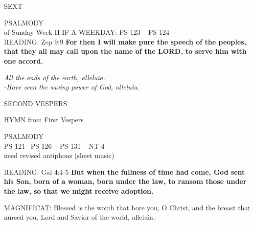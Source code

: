 \begin{flushleft}\normalsize{\uppercase{SEXT\\}}\end{flushleft}
\noindent\small{\uppercase{PSALMODY}\\} of Sunday Week II
\uppercase{If a weekday: Ps 123 -- Ps 124}\vspace{0.5em}\\

\noindent\small{\uppercase{READING:}}    Zep 9:9 \textbf{   For then I will make pure the speech of the peoples, that they all may call upon the name of the LORD, to serve him with one accord.\\}
\begin{center}\textit{All the ends of the earth, alleluia.\\
-Have seen the saving power of God, alleluia.}\end{center}

\begin{flushleft}\normalsize{\uppercase{SECOND VESPERS\\}}\end{flushleft}
HYMN from First Vespers

\noindent\small{\uppercase{PSALMODY}\\}
\uppercase{Ps 121-- Ps 126 -- Ps 131 -- NT 4}\vspace{0.5em}\\

need revised antiphons (sheet music)

\noindent\small{\uppercase{READING:}}    Gal 4:4-5 \textbf{   But when the fullness of time had come, God sent his Son, born of a woman, born under the law, to ransom those under the law, so that we might receive adoption.\\}

\noindent\small{\uppercase{MAGNIFICAT:}}	Blessed is the womb that bore you, O Christ, and the breast that nursed you, Lord and Savior of the world, alleluia.\\
